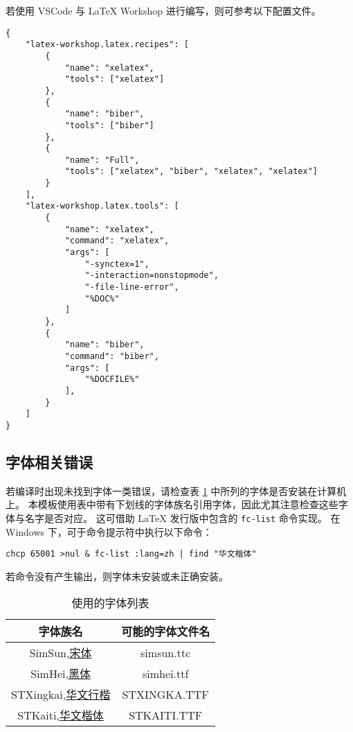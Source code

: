 若使用 VSCode 与 LaTeX Workshop 进行编写，则可参考以下配置文件。
\begin{lstlisting}[caption={LaTeX Workshop 配置}]
{
    "latex-workshop.latex.recipes": [
        {
            "name": "xelatex",
            "tools": ["xelatex"]
        },
        {
            "name": "biber",
            "tools": ["biber"]
        },
        {
            "name": "Full",
            "tools": ["xelatex", "biber", "xelatex", "xelatex"]
        }
    ],
    "latex-workshop.latex.tools": [
        {
            "name": "xelatex",
            "command": "xelatex",
            "args": [
                "-synctex=1",
                "-interaction=nonstopmode",
                "-file-line-error",
                "%DOC%"
            ]
        },
        {
            "name": "biber",
            "command": "biber",
            "args": [
                "%DOCFILE%"
            ],
        }
    ]
}
\end{lstlisting}

\subsection{字体相关错误}

若编译时出现未找到字体一类错误，请检查表 \ref{tab:font-list} 中所列的字体是否安装在计算机上。
本模板使用表中带有下划线的字体族名引用字体，因此尤其注意检查这些字体与名字是否对应。
这可借助 \LaTeX{} 发行版中包含的 \verb|fc-list| 命令实现。
在 Windows 下，可于命令提示符中执行以下命令：
\begin{lstlisting}[caption={检查字体的批处理命令}]
chcp 65001 >nul & fc-list :lang=zh | find "华文楷体"
\end{lstlisting}
若命令没有产生输出，则字体未安装或未正确安装。

\begin{table}
    \centering
    \caption{使用的字体列表}
    \label{tab:font-list}
    \begin{tabular}{cc}
        \hline 
         字体族名 & 可能的字体文件名 \\ \hline
         SimSun,\underline{宋体} & simsun.ttc \\
         SimHei,\underline{黑体} & simhei.ttf \\
         STXingkai,\underline{华文行楷} & STXINGKA.TTF \\
         STKaiti,\underline{华文楷体} & STKAITI.TTF \\ \hline
    \end{tabular}
\end{table}


